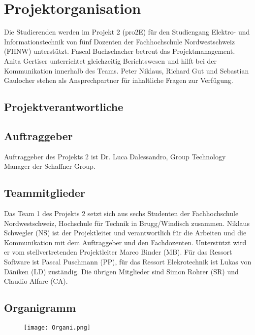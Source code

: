 \section{Projektorganisation}


Die Studierenden werden im Projekt 2 (pro2E) für den Studiengang Elektro- und Informationstechnik von fünf Dozenten der Fachhochschule Nordwestschweiz (FHNW) unterstützt. Pascal Buchschacher betreut das Projektmanagement. Anita Gertiser unterrichtet gleichzeitig Berichtswesen und hilft bei der Kommunikation innerhalb des Teams. Peter Niklaus, Richard Gut und Sebastian Gaulocher stehen als Ansprechpartner für inhaltliche Fragen zur Verfügung.

\subsection{Projektverantwortliche}

\subsection{Auftraggeber}
Auftraggeber des Projekts 2 ist Dr. Luca Dalessandro, Group Technology Manager der Schaffner Group.

\subsection{Teammitglieder}
Das Team 1 des Projekts 2 setzt sich aus sechs Studenten der Fachhochschule Nordwestschweiz, Hochschule für Technik in Brugg/Windisch zusammen. Niklaus Schwegler (NS) ist der Projektleiter und verantwortlich für die Arbeiten und die Kommunikation mit dem Auftraggeber und den Fachdozenten. Unterstützt wird er vom stellvertretenden Projektleiter  Marco  Binder (MB). Für das Ressort Software ist Pascal Puschmann (PP), für das Ressort Elekrotechnik ist Lukas von Däniken (LD) zuständig. Die übrigen Mitglieder sind Simon Rohrer (SR) und Claudio Alfare (CA). 

\subsection{Organigramm}
\begin{figure}[H]
	\centering
	\texttt{[image: Organi.png]}
	\label{fig:Organigramm}
\end{figure}
